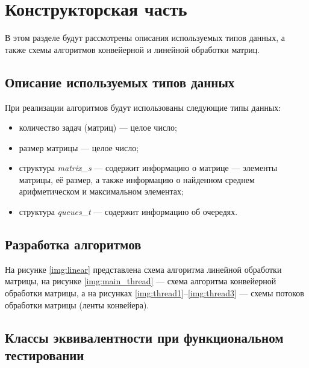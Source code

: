 \chapter{Конструкторская часть}
В этом разделе будут рассмотрены описания используемых типов данных, а также схемы алгоритмов конвейерной и линейной обработки матриц.

\section{Описание используемых типов данных}

При реализации алгоритмов будут использованы следующие типы данных:

\begin{itemize}
	\item количество задач (матриц) --- целое число;
	\item размер матрицы --- целое число;
	\item структура \textit{matrix\_s} --- содержит информацию о матрице --- элементы матрицы, её размер, а также информацию о найденном среднем арифметическом и максимальном элементах;
	\item структура \textit{queues\_t} --- содержит информацию об очередях.
\end{itemize}

\section{Разработка алгоритмов}
На рисунке \ref{img:linear} представлена схема алгоритма линейной обработки матрицы, на рисунке \ref{img:main_thread} --- схема алгоритма конвейерной обработки матрицы, а на рисунках \ref{img:thread1}--\ref{img:thread3} --- схемы потоков обработки матрицы (ленты конвейера).
\clearpage
{}
\clearpage
{}
\clearpage
{}
\clearpage
{}
\clearpage
{}
\clearpage


\section{Классы эквивалентности при функциональном тестировании}

